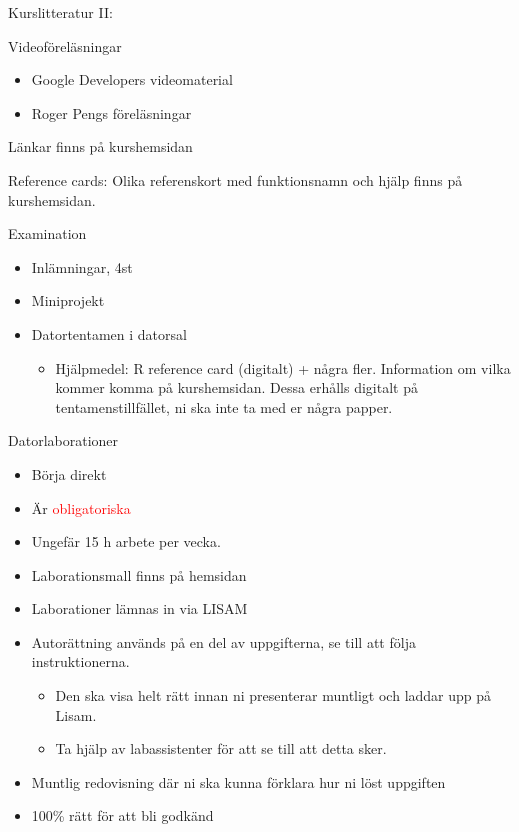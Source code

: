 \documentclass[
  10pt,
  ignorenonframetext,
]{beamer}
\providecommand{\tightlist}{%
  \setlength{\itemsep}{0pt}\setlength{\parskip}{0pt}}
\begin{document}
\begin{frame}{Kurslitteratur II:}
\protect\hypertarget{kurslitteratur-ii}{}
\begin{block}{Videoföreläsningar}
\protect\hypertarget{videofuxf6reluxe4sningar}{}
\begin{itemize}
\tightlist
\item
  Google Developers videomaterial
\item
  Roger Pengs föreläsningar
\end{itemize}

Länkar finns på kurshemsidan
\end{block}

\begin{block}{Reference cards:}
\protect\hypertarget{reference-cards}{}
Olika referenskort med funktionsnamn och hjälp finns på kurshemsidan.
\end{block}
\end{frame}

\begin{frame}{Examination}
\protect\hypertarget{examination}{}
\begin{itemize}
\tightlist
\item
  Inlämningar, 4st
\item
  Miniprojekt
\item
  Datortentamen i datorsal

  \begin{itemize}
  \tightlist
  \item
    Hjälpmedel: R reference card (digitalt) + några fler. Information om
    vilka kommer komma på kurshemsidan. Dessa erhålls digitalt på
    tentamenstillfället, ni ska inte ta med er några papper.
  \end{itemize}
\end{itemize}
\end{frame}

\begin{frame}{Datorlaborationer}
\protect\hypertarget{datorlaborationer}{}
\begin{itemize}
\tightlist
\item
  Börja direkt
\item
  Är \textcolor{red}{obligatoriska}
\item
  Ungefär 15 h arbete per vecka.
\item
  Laborationsmall finns på hemsidan
\item
  Laborationer lämnas in via LISAM
\item
  Autorättning används på en del av uppgifterna, se till att följa
  instruktionerna.

  \begin{itemize}
  \tightlist
  \item
    Den ska visa helt rätt innan ni presenterar muntligt och laddar upp
    på Lisam.
  \item
    Ta hjälp av labassistenter för att se till att detta sker.
  \end{itemize}
\item
  Muntlig redovisning där ni ska kunna förklara hur ni löst uppgiften
\item
  100\% rätt för att bli godkänd
\end{itemize}
\end{frame}
\end{document}
